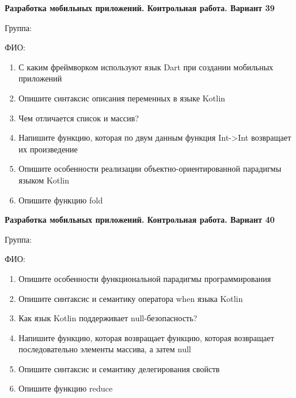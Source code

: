 \documentclass[12pt]{article}
\begin{document}
\newpage\begin{minipage}{\textwidth}
\textbf{Разработка мобильных приложений. Контрольная работа. Вариант 39}

Группа: \underline{\hspace{3cm}}

ФИО: \underline{\hspace{10cm}}

\begin{enumerate}
\item С каким фреймворком используют язык Dart при создании мобильных приложений
\item Опишите синтаксис описания переменных в языке Kotlin
\item Чем отличается список и массив?
\item Напишите функцию, которая по двум данным функция Int->Int возвращает их произведение
\item Опишите особенности реализации объектно-ориентированной парадигмы языком Kotlin
\item Опишите функцию fold

\end{enumerate}
\end{minipage}

\newpage\begin{minipage}{\textwidth}
\textbf{Разработка мобильных приложений. Контрольная работа. Вариант 40}

Группа: \underline{\hspace{3cm}}

ФИО: \underline{\hspace{10cm}}

\begin{enumerate}
\item Опишите особенности функциональной парадигмы программирования
\item Опишите синтаксис и семантику оператора when языка Kotlin
\item Как язык Kotlin поддерживает null-безопасность?
\item Напишите функцию, которая возвращает функцию, которая возвращает последовательно элементы массива, а затем null
\item Опишите синтаксис и семантику делегирования свойств
\item Опишите функцию reduce

\end{enumerate}
\end{minipage}
\end{document}
